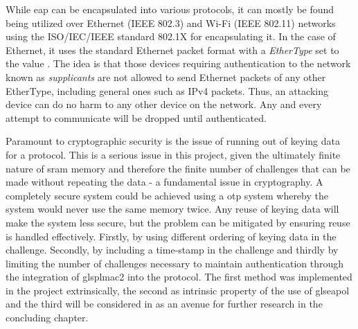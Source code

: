 While \Gls{eap} can be encapsulated into various protocols, it can mostly be
found being utilized over Ethernet (IEEE 802.3) and Wi-Fi (IEEE 802.11) networks using
the ISO/IEC/IEEE standard 802.1X\cite{8802-1x} for encapsulating it. In the case
of Ethernet, it uses the standard Ethernet packet format with a
\emph{EtherType} set to the value .
The idea is that those devices requiring authentication to the network known as
\emph{supplicants} are not allowed to send Ethernet packets of any other
EtherType, including general ones such as  IPv4 packets.
Thus, an attacking device can do no harm to any other device on the network.
Any and every attempt to communicate will be dropped until authenticated.

Paramount to cryptographic security is the issue of running out of keying data
for a protocol. This is a serious issue in this project, given the
ultimately finite nature of \gls{sram} memory and therefore the finite number
of challenges that can be made without repeating the data - a fundamental issue
in cryptography. A completely secure system could be achieved using a \gls{otp}
system whereby the system would never use the same memory twice. Any reuse of
keying data will make the system less secure, but the problem can be mitigated
by ensuring reuse is handled effectively. Firstly, by using different
ordering of keying data in the challenge. Secondly, by including a
time-stamp in the challenge and thirdly by limiting the number of challenges
necessary to maintain authentication through the integration of glspl{mac2} into
the protocol. The first method was implemented in the project extrinsically, the second
as intrinsic property of the use of gls{eapol} and the third will be considered
in as an avenue for further research in the concluding chapter.
